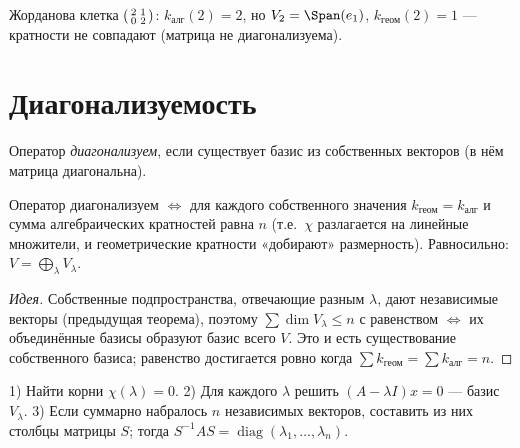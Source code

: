 \begin{example}
Жорданова клетка $\begin{psmallmatrix}2&1\\0&2\end{psmallmatrix}$: $k_{\text{алг}}(2)=2$, но
$V_2=\Span(e_1)$, $k_{\text{геом}}(2)=1$ — кратности не совпадают (матрица не диагонализуема).
\end{example}

\section{Диагонализуемость}

\begin{definition}
Оператор \emph{диагонализуем}, если существует базис из собственных векторов (в нём матрица
диагональна).
\end{definition}

\begin{theorem}[критерий]
Оператор диагонализуем $\iff$ для каждого собственного значения
$k_{\text{геом}}=k_{\text{алг}}$ и сумма алгебраических кратностей равна $n$ (т.е.\ $\chi$
разлагается на линейные множители, и геометрические кратности «добирают» размерность). Равносильно:
$V=\bigoplus_\lambda V_\lambda$.
\end{theorem}

\begin{proof}[Идея]
Собственные подпространства, отвечающие разным $\lambda$, дают независимые векторы (предыдущая
теорема), поэтому $\sum\dim V_\lambda\le n$ с равенством $\iff$ их объединённые базисы образуют
базис всего $V$. Это и есть существование собственного базиса; равенство достигается ровно когда
$\sum k_{\text{геом}}=\sum k_{\text{алг}}=n$.
\end{proof}

\begin{remark}[алгоритм]
1) Найти корни $\chi(\lambda)=0$. 2) Для каждого $\lambda$ решить $(A-\lambda I)x=0$ — базис
$V_\lambda$. 3) Если суммарно набралось $n$ независимых векторов, составить из них столбцы матрицы
$S$; тогда $S^{-1}AS=\operatorname{diag}(\lambda_1,\dots,\lambda_n)$.
\end{remark}
